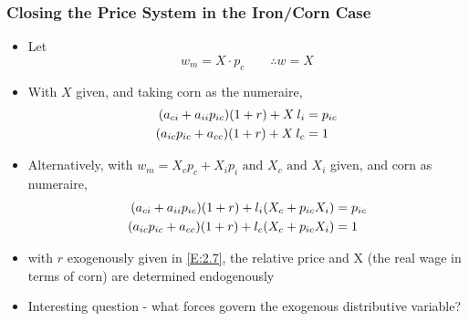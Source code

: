 \documentclass[a4paper,twoside]{article}
\numberwithin{equation}{section}
\numberwithin{figure}{section}
\begin{document}
\subsubsection{Closing the Price System in the Iron/Corn Case}
	\begin{itemize}
		\item  Let
		\begin{equation}
			w_m = X \cdot p_c \qquad \therefore w = X \label{E:2.6}
		\end{equation}
		\item With \( X \) given, and taking corn as the numeraire,
		\begin{align}
			(a_{ci} + a_{ii} p_{ic}) (1 + r) + X \: l_i &= p_{ic} \notag \\
			(a_{ic} p_{ic} + a_{cc}) (1 + r) + X \: l_c &= 1 \label{E:2.7}
		\end{align}
		\item Alternatively, with \( w_m = X_c p_c + X_i p_i \text{ and } X_c \text{ and } X_i\) given, and corn as numeraire,
		\begin{align}
			(a_{ci} + a_{ii} p_{ic}) (1 + r) + l_i ( X_c + p_{ic} X_i) &= p_{ic} \notag \\
			(a_{ic} p_{ic} + a_{cc}) (1 + r) + l_c ( X_c + p_{ic} X_i) &= 1 \label{E:2.8}
		\end{align}
		\item with \( r \) exogenously given in \cref{E:2.7}, the relative price and X (the real wage in terms of corn) are determined endogenously
		\item Interesting question - what forces govern the exogenous distributive variable?
	\end{itemize}
\end{document}
